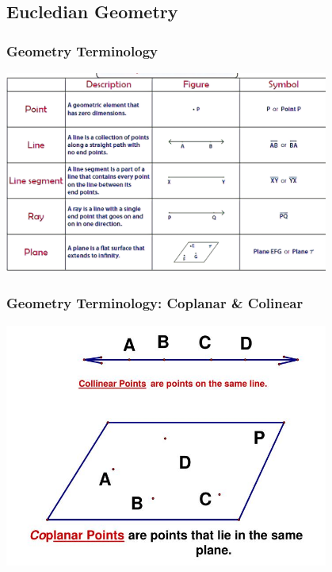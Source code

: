 \documentclass{beamer}
\begin{document}
\subsection{Eucledian Geometry} 

\begin{frame}
    \frametitle{Geometry Terminology}
    
    \begin{center}
        \includegraphics[width=0.8\textwidth]{geometry.png} %
    \end{center}
\end{frame}
\begin{frame}
    \frametitle{Geometry Terminology: Coplanar \& Colinear}
    \begin{center}
        \includegraphics[width=0.8\textwidth]{coplanar.jpg} %
    \end{center}
\end{frame}
\end{document}
